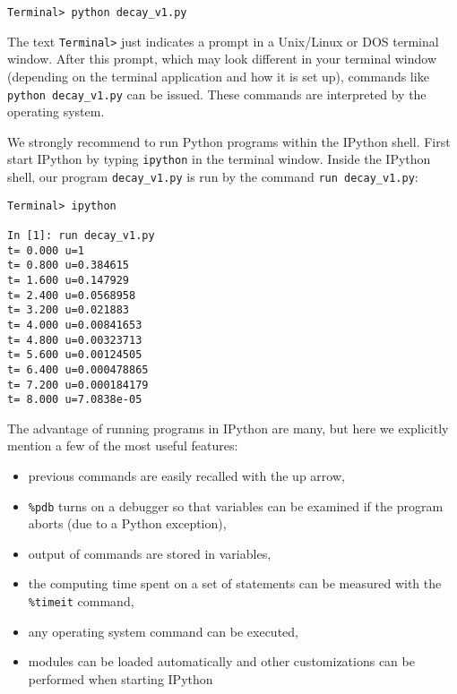 \documentclass[graybox,sectrefs,envcountresetchap,open=right,final]{svmonodo}
\begin{document}
\begin{Verbatim}[frame=lines,label=\fbox{{\tiny Terminal}},framesep=2.5mm,framerule=0.7pt,fontsize=\fontsize{9pt}{9pt}]
Terminal> python decay_v1.py
\end{Verbatim}
The text \texttt{Terminal>} just indicates a prompt in a
Unix/Linux or DOS terminal window. After this prompt, which may look
different in your terminal window (depending on the terminal application
and how it is set up), commands like \Verb!python decay_v1.py! can be issued.
These commands are interpreted by the operating system.

We strongly recommend to run Python programs within the IPython shell.
First start IPython by typing \texttt{ipython} in the terminal window.
Inside the IPython shell, our program \Verb!decay_v1.py! is run by the command
\Verb!run decay_v1.py!:

\begin{Verbatim}[frame=lines,label=\fbox{{\tiny Terminal}},framesep=2.5mm,framerule=0.7pt,fontsize=\fontsize{9pt}{9pt}]
Terminal> ipython

In [1]: run decay_v1.py
t= 0.000 u=1
t= 0.800 u=0.384615
t= 1.600 u=0.147929
t= 2.400 u=0.0568958
t= 3.200 u=0.021883
t= 4.000 u=0.00841653
t= 4.800 u=0.00323713
t= 5.600 u=0.00124505
t= 6.400 u=0.000478865
t= 7.200 u=0.000184179
t= 8.000 u=7.0838e-05
\end{Verbatim}

The advantage of running programs in IPython are many, but here
we explicitly mention a few of the most
useful features:

\begin{itemize}
 \item previous commands are easily recalled with the up arrow,

 \item \Verb!%
   aborts (due to a Python exception),

 \item output of commands are stored in variables,

 \item the computing time spent on a set of statements can be measured with
   the \Verb!%

 \item any operating system command can be executed,

 \item modules can be loaded automatically and other customizations can
   be performed when starting IPython
\end{itemize}
\end{document}

